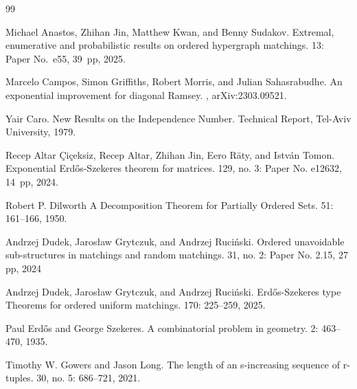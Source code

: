 \documentclass[11pt]{article}
\theoremstyle{definition}
\numberwithin{equation}{section}
\numberwithin{figure}{section}
\begin{document}
\begin{thebibliography}{99}



Michael Anastos, Zhihan Jin, Matthew Kwan, and Benny Sudakov.
\newblock Extremal, enumerative and probabilistic results on ordered hypergraph matchings.
 13: Paper No.~e55, 39~pp, 2025.

Marcelo Campos, Simon Griffiths, Robert Morris, and Julian Sahasrabudhe. 
\newblock An exponential improvement for diagonal Ramsey.
, arXiv:2303.09521.

Yair Caro. 
\newblock New Results on the Independence Number.
\newblock Technical Report, Tel-Aviv University, 1979.

Recep Altar Çiçeksiz, Recep Altar, Zhihan Jin, Eero Räty, and István Tomon. 
\newblock Exponential Erd\H{o}s-Szekeres theorem for matrices.
 129, no. 3: Paper No. e12632, 14~pp, 2024.

Robert P. Dilworth 
\newblock A Decomposition Theorem for Partially Ordered Sets.
  51: 161--166, 1950.

Andrzej Dudek, Jarosław Grytczuk, and Andrzej Ruci\'{n}ski. 
\newblock Ordered unavoidable sub-structures in matchings and random matchings.
 31, no. 2: Paper No. 2.15, 27 pp, 2024

Andrzej Dudek, Jarosław Grytczuk, and Andrzej Ruci\'{n}ski. 
\newblock Erd\H{o}s-Szekeres type Theorems for ordered uniform matchings.
 170: 225--259, 2025.

Paul Erd{\H o}s and George Szekeres. 
\newblock A combinatorial problem in geometry.
 2: 463--470, 1935.

 Timothy W. Gowers and Jason Long.
\newblock The length of an s-increasing sequence of r-tuples.  30, no. 5: 686--721, 2021.


\end{thebibliography}
\end{document}
